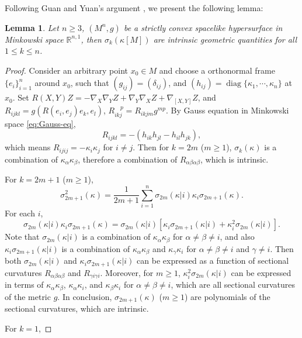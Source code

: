 \documentclass[10pt,a4paper]{amsart}
\newtheorem{lemma}[theorem]{Lemma}
\newcommand{\R}{\ensuremath{\mathbb{R}}}
\newcommand{\diag}[1]{\ensuremath{\operatorname{diag}\{ #1 \}}}
\numberwithin{equation}{section}
\begin{document}
\bigskip

Following Guan and Yuan's argument \cite{guan2025-intrinsicality}, we present the following lemma: 
\begin{lemma}\label{lem:intrincity}
    Let \(n \geq 3\), \((M^n,g)\) be a strictly convex spacelike hypersurface in Minkowski space \(\R^{n,1}\), then \(\sigma_k(\kappa[M])\) are intrinsic geometric quantities for all \(1\leq k \leq n\). 
\end{lemma}
\begin{proof}
    Consider an arbitrary point \(x_0\in M\) and choose a orthonormal frame \(\{e_i\}_{i=1}^n\) around \(x_0\), such that \((g_{ij}) = (\delta_{ij})\), and \( (h_{ij})= \diag{\kappa_1,\cdots,\kappa_n}\) at \(x_0\). Set \({R}(X,Y)Z = -\nabla_X\nabla_Y Z + \nabla_Y\nabla_X Z + \nabla_{[X,Y]}Z\), and \({R}_{ijkl} = g(R(e_i,e_j)e_k,e_l)\), \( {R}_{ikj}^{\quad p} = {R}_{ikjm}g^{mp} \). By Gauss equation in Minkowski space \eqref{eq:Gauss-eq}, 
    \[ R_{ijkl} = -(h_{ik}h_{jl} - h_{il}h_{jk}), \]
    which means \(R_{ijij} = - \kappa_i \kappa_j\) for \(i\neq j\). Then for \(k=2m\) (\(m \geq 1\)), \(\sigma_k(\kappa)\) is a combination of \(\kappa_\alpha \kappa_\beta\), therefore a combination of \(R_{\alpha\beta\alpha\beta}\), which is intrinsic. 
    \par For \(k = 2m+1\) (\(m\geq 1\)), 
    \[ \sigma_{2m+1}^2(\kappa) = \frac{1}{2m+1}\sum_{i=1}^{n}\sigma_{2m}(\kappa|i)\kappa_i \sigma_{2m+1}(\kappa). \]
    For each \(i\), 
    \[ \sigma_{2m}(\kappa|i)\kappa_i \sigma_{2m+1}(\kappa) = \sigma_{2m}(\kappa|i)[\kappa_i\sigma_{2m+1}(\kappa|i) + \kappa_i^2\sigma_{2m}(\kappa|i)]. \]
    Note that \(\sigma_{2m}(\kappa|i)\) is a combination of \(\kappa_\alpha \kappa_{\beta}\) for \(\alpha\neq \beta \neq i\), and also \(\kappa_i\sigma_{2m+1}(\kappa|i)\) is a combination of \(\kappa_\alpha\kappa_\beta\) and \(\kappa_\gamma\kappa_i\) for \(\alpha\neq \beta\neq i\) and \(\gamma\neq i\). Then both \(\sigma_{2m}(\kappa|i)\) and \(\kappa_i\sigma_{2m+1}(\kappa|i)\) can be expressed as a function of sectional curvatures \(R_{\alpha\beta\alpha\beta}\) and \(R_{\gamma i \gamma i}\). Moreover, for \(m\geq 1\), \(\kappa_i^2 \sigma_{2m}(\kappa|i)\) can be expressed in terms of \(\kappa_\alpha \kappa_\beta\), \(\kappa_\alpha\kappa_i\), and \(\kappa_\beta\kappa_i\) for \(\alpha\neq\beta\neq i\), which are all sectional curvatures of the metric \(g\). In conclusion, \(\sigma_{2m+1}(\kappa)\) (\(m\geq 1\)) are polynomials of the sectional curvatures, which are intrinsic. 
    \par For \(k=1\), 

\end{proof}
\end{document}
